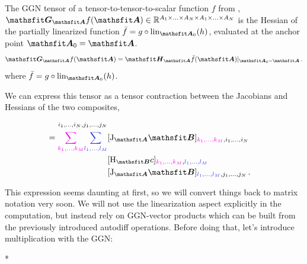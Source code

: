 \begin{definition}\label{def:general_ggn}%
  The GGN tensor of a tensor-to-tensor-to-scalar function $f$ from , $\tG_{\tA} f(\tA) \in \sR^{A_1 \times \ldots \times A_N \times A_1 \times \ldots \times A_N}$ is the Hessian of the partially linearized function $\bar{f} = g \circ \lin_{\tA_0}(h)$, evaluated at the anchor point $\tA_0 = \tA$.
  \begin{align*}
    \tG_{\tA} f(\tA)
    =
    \tH_{\tA} \bar{f}(\tA)|_{\tA_0 = \tA}\,.
  \end{align*}
  where $\bar{f} = g \circ \lin_{\tA_0}(h)$.

  We can express this tensor as a tensor contraction between the Jacobians and Hessians of the two composites, \ie
  \begin{align*}
    [\tG_{\tA} f(\tA)]_{i_1, \ldots, i_N, j_1, \ldots, j_N}
    \\
    =
    \textcolor{VectorPink}{\sum_{k_1, \dots, k_M}}
    \textcolor{VectorBlue}{\sum_{l_1, \dots, l_M}}
    & [\jac_{\tA} \tB]_{\textcolor{VectorPink}{k_1, \dots, k_M}, i_1, \dots, i_N}
    \\
    & [\hess_{\tB} c]_{\textcolor{VectorPink}{k_{1}, \ldots, k_{M}}, \textcolor{VectorBlue}{l_{1}, \ldots, l_{M}}}
    \\
    & [\jac_{\tA} \tB]_{\textcolor{VectorBlue}{l_1, \ldots, l_M}, j_1, \ldots, j_N}\,.
  \end{align*}
\end{definition}
This expression seems daunting at first, so we will convert things back to matrix notation very soon.
We will not use the linearization aspect explicitly in the computation, but instead rely on GGN-vector products which can be built from the previously introduced autodiff operations.
Before doing that, let's introduce multiplication with the GGN:

\switchcolumn[1]*
\switchcolumn[0]

